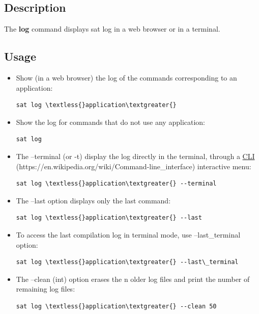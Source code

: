 \documentclass[a4paper,10pt,english]{sphinxmanual}
\begin{document}
\subsection{Description}
\label{commands/log:description}
The \textbf{log} command displays sat log in a web browser or in a terminal.


\subsection{Usage}
\label{commands/log:usage}\begin{itemize}
\item {} 
Show (in a web browser) the log of the commands corresponding to an application:

\begin{Verbatim}[commandchars=\\\{\}]
sat log \textless{}application\textgreater{}
\end{Verbatim}

\item {} 
Show the log for commands that do not use any application:

\begin{Verbatim}[commandchars=\\\{\}]
sat log
\end{Verbatim}

\item {} 
The --terminal (or -t) display the log directly in the terminal, through a \href{https://en.wikipedia.org/wiki/Command-line\_interface}{CLI} (https://en.wikipedia.org/wiki/Command-line\_interface) interactive menu:

\begin{Verbatim}[commandchars=\\\{\}]
sat log \textless{}application\textgreater{} --terminal
\end{Verbatim}

\item {} 
The --last option displays only the last command:

\begin{Verbatim}[commandchars=\\\{\}]
sat log \textless{}application\textgreater{} --last
\end{Verbatim}

\item {} 
To access the last compilation log in terminal mode, use --last\_terminal option:

\begin{Verbatim}[commandchars=\\\{\}]
sat log \textless{}application\textgreater{} --last\_terminal
\end{Verbatim}

\item {} 
The --clean (int) option erases the n older log files and print the number of remaining log files:

\begin{Verbatim}[commandchars=\\\{\}]
sat log \textless{}application\textgreater{} --clean 50
\end{Verbatim}

\end{itemize}
\end{document}
